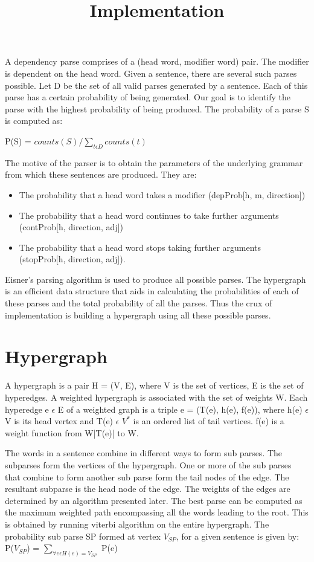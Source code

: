 \documentclass{article}
\title{Implementation}
\begin{document}
\maketitle{}

\date{}

A dependency parse comprises of a (head word, modifier word) pair. The modifier is dependent on the head word. Given a sentence, there are several such parses possible. Let D be the set of all valid parses generated by a sentence. Each of this parse has a certain probability of being generated. Our goal is to identify the parse with the highest probability of being produced. The probability of a parse S is computed as:

            P(S) = $counts(S) / \sum_{t \epsilon D} counts(t) $

The motive of the parser is to obtain the parameters of the underlying grammar from which these sentences are produced. They are: 

\begin{itemize}
\item The probability that a head word takes a modifier (depProb[h, m, direction])
\item The probability that a head word continues to take further arguments (contProb[h, direction, adj])
\item The probability that a head word stops taking further arguments (stopProb[h, direction, adj]).
\end{itemize}

Eisner's parsing algorithm is used to produce all possible parses. The hypergraph is an efficient data structure that aids in calculating the probabilities of each of these parses and the total probability of all the parses. Thus the crux of implementation is building a hypergraph using all these possible parses.

\section{Hypergraph}

A hypergraph is a pair H = (V, E), where V is the set of vertices, E is the set of hyperedges. A weighted hypergraph is associated with the set of weights W. Each hyperedge e $\epsilon$ E of a weighted graph is a triple e = (T(e), h(e), f(e)), where h(e) $\epsilon$ V is its head vertex and T(e) $\epsilon$ $V^*$ is an ordered list of tail vertices. f(e) is a weight function from W|T(e)| to W.

The words in a sentence combine in different ways to form sub parses. The subparses form the vertices of the hypergraph. One or more of the sub parses that combine to form another sub parse form the tail nodes of the edge. The resultant subparse is the head node of the edge. The weights of the edges are determined by an algorithm presented later. The best parse can be computed as the maximum weighted path encompassing all the words leading to the root. This is obtained by running viterbi algorithm on the entire hypergraph.
  The probability sub parse SP formed at vertex $V_{SP}$, for a given sentence is given by:
            P($V_{SP}$) = $\sum_{\forall e \epsilon H(e) = V_{SP}}$ P(e)
\end{document}
